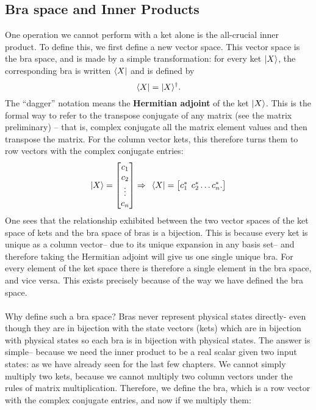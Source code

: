 \subsection{Bra space and Inner Products}
One operation we cannot perform with a ket alone is the all-crucial inner product. To define this, we first define a new vector space. This vector space is the bra space, and is made by a simple transformation: for every ket $|X\rangle$, the corresponding bra is written $\langle X|$ and is defined by
$$
\langle X|=|X\rangle^{\dagger}.
$$
The ``dagger'' notation means the \textbf{Hermitian adjoint} of the ket $|X\rangle$. This is the formal way to refer to the transpose conjugate of any matrix (see the matrix preliminary) -- that is, complex conjugate all the matrix element values and then transpose the matrix. For the column vector kets, this therefore turns them to row vectors with the complex conjugate entries:
$$
|X\rangle=\begin{bmatrix}
c_{1}\\
c_{2}\\
\vdots\\
c_{n}\\
\end{bmatrix}\Rightarrow\:\:\langle X|=\begin{bmatrix}
c^{\ast}_{1}\:\: c^{\ast}_{2} \dots c^{\ast}_{n}.
\end{bmatrix}
$$
One sees that the relationship exhibited between the two vector spaces of the ket space of kets and the bra space of bras is a bijection. This is because every ket is unique as a column vector-- due to its unique expansion in any basis set-- and therefore taking the Hermitian adjoint will give us one single unique bra. For every element of the ket space there is therefore a single element in the bra space, and vice versa. This exists precisely because of the way we have defined the bra space.
\\\\
Why define such a bra space? Bras never represent physical states directly- even though they are in bijection with the state vectors (kets) which are in bijection with physical states so each bra is in bijection with physical states. The answer is simple-- because we need the inner product to be a real scalar given two input states: as we have already seen for the last few chapters. We cannot simply multiply two kets, because we cannot multiply two column vectors under the rules of matrix multiplication. Therefore, we define the bra, which is a row vector with the complex conjugate entries, and now if we multiply them:
